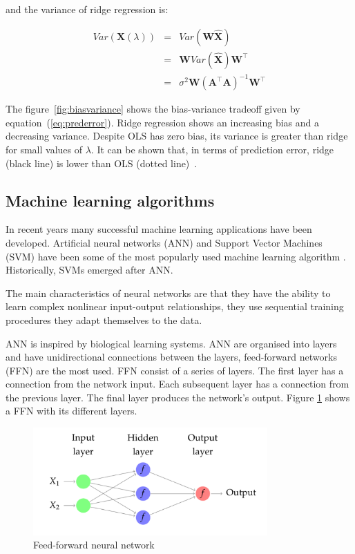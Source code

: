 \noindent and the variance of ridge regression is:

\begin{eqnarray*}
Var(\mathbf{X}(\lambda)) &=& Var(\mathbf{W}\hat{\mathbf{X}}) \\ 
&=& \mathbf{W}Var(\hat{\mathbf{X}})\mathbf{W}^\top \\
&=& \sigma^2 \mathbf{W}(\mathbf{A}^\top \mathbf{A} )^{-1}\mathbf{W}^\top
\end{eqnarray*}


The figure~\ref{fig:biasvariance} shows the bias-variance tradeoff
given by equation~(\ref{eq:prederror}). Ridge regression shows an
increasing bias and a decreasing variance. Despite OLS has zero bias,
its variance is greater than ridge for small values of $\lambda$.
It can be shown that, in terms of prediction error, ridge (black line)
is lower than OLS (dotted line)~\cite{hoerl1970}.






\subsection{Machine learning algorithms}
In recent years many successful machine learning applications have been developed. Artificial neural networks (ANN) and Support Vector Machines (SVM) have been some of the most popularly used machine learning algorithm \cite{haykin1998}. Historically, SVMs emerged after ANN.

The main characteristics of neural networks are that they have the ability to learn
complex nonlinear input-output relationships, they use sequential training procedures 
they adapt themselves to the data.

ANN is inspired by biological learning systems. ANN are organised into layers and have unidirectional connections between the layers, feed-forward networks  (FFN) are the most used.  FFN consist of a series of layers. The first layer has a connection from the network input. Each subsequent layer has a connection from the previous layer. The final layer produces the network's output. Figure \ref{fig:ffn} shows a FFN with its different layers.

\begin{figure}[!h]
  \centering
  \includegraphics[width=0.8\textwidth]{img/ffn}
  \caption{Feed-forward neural network}
  \label{fig:ffn}
\end{figure}



